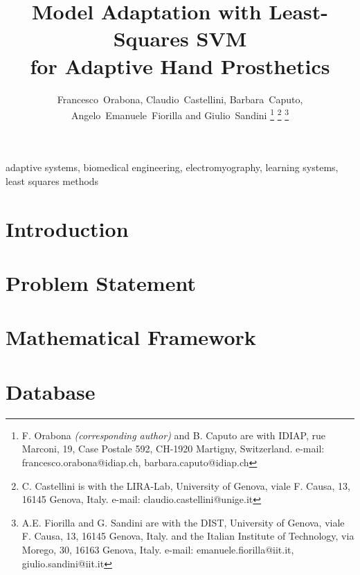 \documentclass[conference,letterpaper]{IEEEtran}
\begin{document}

\title{Model Adaptation with Least-Squares SVM\\for Adaptive Hand Prosthetics}

\author{Francesco~Orabona, Claudio~Castellini, Barbara~Caputo, Angelo~Emanuele~Fiorilla and Giulio~Sandini
\thanks{F. Orabona \emph{(corresponding author)} and B. Caputo
  are with IDIAP,
  rue Marconi, 19, Case Postale 592, CH-1920 Martigny, Switzerland.
  e-mail: francesco.orabona@idiap.ch, barbara.caputo@idiap.ch}%
\thanks{C. Castellini
  is with the LIRA-Lab, University of Genova,
  viale F. Causa, 13, 16145 Genova, Italy.
  e-mail: claudio.castellini@unige.it}%
\thanks{A.E. Fiorilla and G. Sandini
  are with the DIST, University of Genova,
  viale F. Causa, 13, 16145 Genova, Italy.
  and the Italian Institute of Technology,
  via Morego, 30, 16163 Genova, Italy.
  e-mail: emanuele.fiorilla@iit.it, giulio.sandini@iit.it}%
}

\maketitle

\begin{abstract}
  
\end{abstract}

\begin{IEEEkeywords}
  adaptive systems, biomedical engineering, electromyography,
  learning systems, least squares methods
\end{IEEEkeywords}

\IEEEpeerreviewmaketitle


\section{Introduction}
\label{sec:intro}


\section{Problem Statement}
\label{sec:prob}


\section{Mathematical Framework}
\label{sec:math}


\section{Database}
\label{sec:mms}

\end{document}
